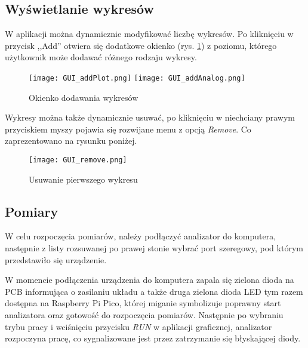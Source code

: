     \subsection{Wyświetlanie wykresów}
        W aplikacji można dynamicznie modyfikować liczbę wykresów.
        Po kliknięciu w przycisk ,,Add'' otwiera się dodatkowe okienko (rys. \ref{fig:gui_addPlot}) z poziomu,
        którego użytkownik może dodawać różnego rodzaju wykresy.
        \begin{figure}[!ht]
            \centering
            \texttt{[image: GUI\_addPlot.png]}
            \texttt{[image: GUI\_addAnalog.png]}
            \caption{Okienko dodawania wykresów}
            \label{fig:gui_addPlot}
        \end{figure}

        Wykresy można także dynamicznie usuwać, po kliknięciu w niechciany prawym przyciskiem myszy pojawia się rozwijane menu z opcją \textit{Remove}.
        Co zaprezentowano na rysunku poniżej.

        \begin{figure}[!ht]
            \centering
            \texttt{[image: GUI\_remove.png]}
            \caption{Usuwanie pierwszego wykresu}
            \label{fig:gui_removePlot}
        \end{figure}

    
    \subsection{Pomiary}
        W celu rozpoczęcia pomiarów, należy podłączyć analizator do komputera, 
        następnie z listy rozsuwanej po prawej stonie wybrać port szeregowy,
        pod którym przedstawiło się urządzenie.

        W momencie podłączenia urządzenia do komputera zapala się zielona dioda na PCB informująca o zasilaniu układu a także
        druga zielona dioda LED tym razem dostępna na Raspberry Pi Pico, której miganie symbolizuje poprawny start analizatora oraz gotowość do rozpoczęcia pomiarów.
        Następnie po wybraniu trybu pracy i wciśnięciu przycisku \textit{RUN} w aplikacji graficznej, analizator rozpoczyna pracę,
        co sygnalizowane jest przez zatrzymanie się błyskającej diody.
        